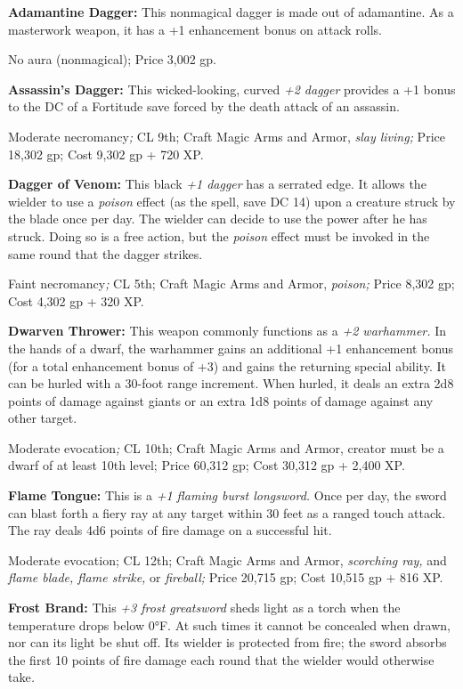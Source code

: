 \textbf{Adamantine Dagger: }This nonmagical dagger is made out of adamantine. As 
a masterwork weapon, it has a +1 enhancement bonus on attack rolls.

No aura (nonmagical); Price 3,002 gp.

\textbf{Assassin's Dagger:} This wicked-looking, curved \textit{+2 dagger }provides 
a +1 bonus to the DC of a Fortitude save forced by the death attack of an assassin.

Moderate necromancy\textit{; }CL 9th; Craft Magic Arms and Armor, \textit{slay 
living; }Price 18,302 gp; Cost 9,302 gp + 720 XP.

\textbf{Dagger of Venom: }This black \textit{+1 dagger }has a serrated edge. It 
allows the wielder to use a \textit{poison }effect (as the spell, save DC 14) upon 
a creature struck by the blade once per day. The wielder can decide to use the 
power after he has struck. Doing so is a free action, but the \textit{poison }effect 
must be invoked in the same round that the dagger strikes.

Faint necromancy\textit{; }CL 5th; Craft Magic Arms and Armor, \textit{poison; 
}Price 8,302 gp; Cost 4,302 gp + 320 XP.

\textbf{Dwarven Thrower: }This weapon commonly functions as a \textit{+2 warhammer. 
}In the hands of a dwarf, the warhammer gains an additional +1 enhancement bonus 
(for a total enhancement bonus of +3) and gains the returning special ability. 
It can be hurled with a 30-foot range increment. When hurled, it deals an extra 
2d8 points of damage against giants or an extra 1d8 points of damage against any 
other target.

Moderate evocation\textit{; }CL 10th; Craft Magic Arms and Armor, creator must 
be a dwarf of at least 10th level; Price 60,312 gp; Cost 30,312 gp + 2,400 XP.

\textbf{Flame Tongue:} This is a \textit{+1 flaming burst longsword. }Once per 
day, the sword can blast forth a fiery ray at any target within 30 feet as a ranged 
touch attack. The ray deals 4d6 points of fire damage on a successful hit.

Moderate evocation; CL 12th; Craft Magic Arms and Armor, \textit{scorching ray, 
}and \textit{flame blade, flame strike, }or \textit{fireball; }Price 20,715 gp; 
Cost 10,515 gp + 816 XP.

\textbf{Frost Brand:} This \textit{+3 frost greatsword }sheds light as a torch 
when the temperature drops below 0°F. At such times it cannot be concealed when 
drawn, nor can its light be shut off. Its wielder is protected from fire; the sword 
absorbs the first 10 points of fire damage each round that the wielder would otherwise 
take\textit{.}

